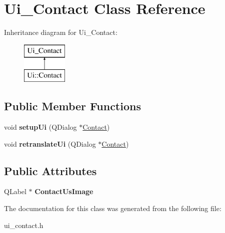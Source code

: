 \hypertarget{class_ui___contact}{}\section{Ui\+\_\+\+Contact Class Reference}
\label{class_ui___contact}
Inheritance diagram for Ui\+\_\+\+Contact\+:\begin{figure}[H]
\begin{center}
\leavevmode
\includegraphics[height=2.000000cm]{class_ui___contact}
\end{center}
\end{figure}
\subsection*{Public Member Functions}
\begin{DoxyCompactItemize}
\item 
\mbox{\label{class_ui___contact_ac731f4f9be5756a93ce6e2020d6bb103}} 
void {\bfseries setup\+Ui} (Q\+Dialog $\ast$\hyperlink{class_contact}{Contact})
\item 
\mbox{\label{class_ui___contact_a733b9a62964ac18185c9eb9097f689f4}} 
void {\bfseries retranslate\+Ui} (Q\+Dialog $\ast$\hyperlink{class_contact}{Contact})
\end{DoxyCompactItemize}
\subsection*{Public Attributes}
\begin{DoxyCompactItemize}
\item 
\mbox{\label{class_ui___contact_a5aae395305d53fdcb3ed259d9dc6e317}} 
Q\+Label $\ast$ {\bfseries Contact\+Us\+Image}
\end{DoxyCompactItemize}


The documentation for this class was generated from the following file\+:\begin{DoxyCompactItemize}
\item 
ui\+\_\+contact.\+h\end{DoxyCompactItemize}
